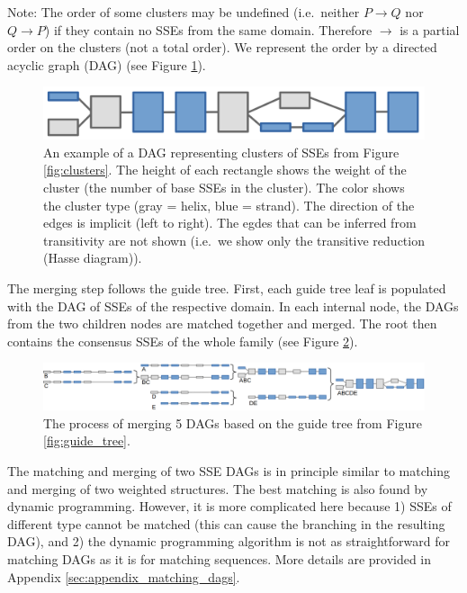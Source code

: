 \documentclass{article}
\begin{document}
Note: The order of some clusters may be undefined (i.e.~neither 
\(P \rightarrow Q\) nor \(Q \rightarrow P\)) if they contain no SSEs 
from the same domain. Therefore \(\rightarrow\) is a partial order on the clusters (not a total order).
We represent the order by a directed acyclic graph (DAG) (see Figure \ref{fig:dag_example}).

\begin{figure}[h!]
  \centering\includegraphics[width=0.6\linewidth]{figures/dag_ABCDE.png}
  \caption{An example of a DAG representing clusters of SSEs from Figure \ref{fig:clusters}. 
  The height of each rectangle shows the weight of the cluster (the number of base SSEs in the cluster).
  The color shows the cluster type (gray = helix, blue = strand).
  The direction of the edges is implicit (left to right).
  The egdes that can be inferred from transitivity are not shown 
  (i.e.~we show only the transitive reduction (Hasse diagram)). }
  \label{fig:dag_example}
\end{figure}

The merging step follows the guide tree. First, each guide tree leaf is
populated with the DAG of SSEs of the respective domain. 
In each internal node, the DAGs from the two children nodes are matched together and merged. 
The root then contains the consensus SSEs of the whole family (see Figure \ref{fig:dag_merging}). 

\begin{figure}[h!]
  \centering\includegraphics[width=\linewidth]{figures/dag_merging.png}
  \caption{The process of merging 5 DAGs based on the guide tree from Figure \ref{fig:guide_tree}.}
  \label{fig:dag_merging}
\end{figure}

The matching and merging of two SSE DAGs is in principle similar to matching
and merging of two weighted structures. 
The best matching is also found by dynamic programming.
However, it is more complicated here because 
1) SSEs of different type cannot be matched (this can cause the
branching in the resulting DAG), 
and 2) the dynamic programming algorithm is not as straightforward 
for matching DAGs as it is for matching sequences.
More details are provided in Appendix \ref{sec:appendix_matching_dags}.
\end{document}
